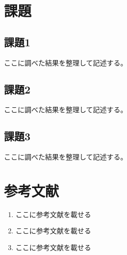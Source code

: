 \documentclass[11pt,a4paper]{jsarticle}
\newcommand{\sizi}[1]{\textcolor{OliveGreen}{\lbrack #1\rbrack}}
\begin{document}
\section{課題}
\subsection{課題1}
\noindent
\sizi{ここに調べた結果を整理して記述する。}

\subsection{課題2}
\noindent
\sizi{ここに調べた結果を整理して記述する。}

\subsection{課題3}
\noindent
\sizi{ここに調べた結果を整理して記述する。}

	
	\section{参考文献}
	\begin{enumerate}
		\renewcommand{\labelenumi}{\lbrack \arabic{enumi}\rbrack}
		\item \sizi{ここに参考文献を載せる}
		\item \sizi{ここに参考文献を載せる}
		\item \sizi{ここに参考文献を載せる}
	\end{enumerate}
	
\end{document}
